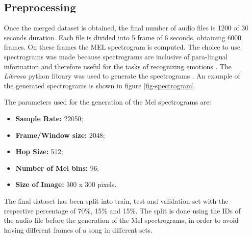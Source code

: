 \documentclass[runningheads]{llncs}
\begin{document}
\subsection{Preprocessing}

Once the merged dataset is obtained, the final number of audio files is 1200 of 30 seconds duration.  Each file is divided into 5 frame of 6 seconds, obtaining 6000 frames. 
On these frames the MEL spectrogram is computed. The choice to use spectrograms was made because spectrograms are inclusive of para-lingual information and therefore useful for the tasks of recognizing emotions \cite{ma2018emotion}. The \textit{Librosa} python library was used to generate the spectrograms \cite{mcfee2015librosa}. An example of the generated spectrograms is shown in figure \ref{fig-spectrogram}.

The parameters used for the generation of the Mel spectrograms are:
\begin{itemize}
    \item \textbf{Sample Rate:} 22050;
    \item \textbf{Frame/Window size:} 2048;
    \item \textbf{Hop Size:} 512;
    \item \textbf{Number of Mel bins:} 96;
    \item \textbf{Size of Image:} 300 x 300 pixels.
\end{itemize}
The final dataset has been split into train, test and validation set with the respective percentage of 70\%, 15\% and 15\%. The split is done using the IDs of the audio file before the generation of the Mel spectrograms, in order to avoid having different frames of a song in different sets.
\end{document}
